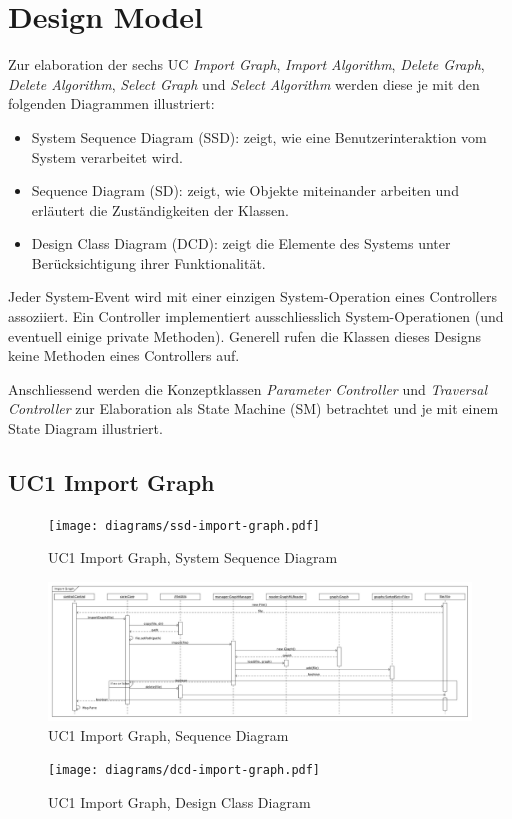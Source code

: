 \section{Design Model}
\label{sec:Design Model}
Zur elaboration der sechs UC \textit{Import Graph}, \textit{Import Algorithm}, \textit{Delete Graph}, \textit{Delete Algorithm}, \textit{Select Graph} und \textit{Select Algorithm} werden diese je mit den folgenden Diagrammen illustriert:
\begin{itemize}
  \item System Sequence Diagram (SSD): zeigt, wie eine Benutzerinteraktion vom System verarbeitet wird.
  \item Sequence Diagram (SD): zeigt, wie Objekte miteinander arbeiten und erl\"autert die Zust\"andigkeiten der Klassen. 
  \item Design Class Diagram (DCD): zeigt die Elemente des Systems unter Ber\"ucksichtigung ihrer Funktionalit\"at.
\end{itemize}
Jeder System-Event wird mit einer einzigen System-Operation eines Controllers assoziiert. Ein Controller implementiert ausschliesslich System-Operationen (und eventuell einige private Methoden). Generell rufen die Klassen dieses Designs keine Methoden eines Controllers auf.

Anschliessend werden die Konzeptklassen \textit{Parameter Controller} und \textit{Traversal Controller} zur Elaboration als State Machine (SM) betrachtet und je mit einem State Diagram illustriert.
% 
\subsection{UC1 Import Graph}
\begin{figure}[p]
    \centering
    \texttt{[image: diagrams/ssd-import-graph.pdf]}
    \caption{UC1 Import Graph, System Sequence Diagram}
    \label{fig:import-graph-ssd}
\end{figure}
\begin{figure}[p]
    \centering
    \includegraphics[width=\textwidth]{diagrams/sd-import-graph.pdf}
    \caption{UC1 Import Graph, Sequence Diagram}
    \label{fig:import-graph-sd}
\end{figure}
\begin{figure}[p]
    \centering
    \texttt{[image: diagrams/dcd-import-graph.pdf]}
    \caption{UC1 Import Graph, Design Class Diagram}
    \label{fig:import-graph-dcd}
\end{figure}
% 
